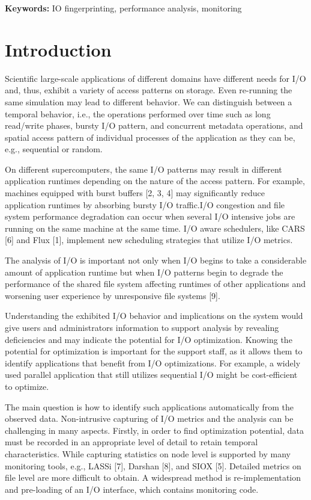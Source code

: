 \documentclass[]{llncs}
\begin{document}
\textbf{Keywords: }IO fingerprinting, performance analysis, monitoring

\section{Introduction}
Scientific large-scale applications of different domains have different needs for I/O and, thus, exhibit a variety of access patterns on storage.
Even re-running the same simulation may lead to different behavior.
We can distinguish between a temporal behavior, i.e., the operations performed over time such as long read/write phases, bursty I/O pattern, and concurrent metadata operations, and spatial access pattern of individual processes of the application as they can be, e.g., sequential or random.

On different supercomputers, the same I/O patterns may result in different application runtimes depending on the nature of the access pattern.
For example, machines equipped with burst buffers [2, 3, 4] may significantly reduce application runtimes by absorbing bursty I/O traffic.I/O congestion and file system performance degradation can occur when several I/O intensive jobs are running on the same machine at the same time.
I/O aware schedulers, like CARS [6] and Flux [1], implement new scheduling strategies that utilize I/O metrics.

The analysis of I/O is important not only when I/O begins to take a considerable amount of application runtime but when I/O patterns begin to degrade the performance of the shared file system affecting runtimes of other applications and worsening user experience by unresponsive file systems [9].

Understanding the exhibited I/O behavior and implications on the system would give users and administrators information to support analysis by revealing deficiencies and may indicate the potential for I/O optimization.
Knowing the potential for optimization is important for the support staff, as it allows them to identify applications that benefit from I/O optimizations.
For example, a widely used parallel application that still utilizes sequential I/O might be cost-efficient to optimize.

The main question is how to identify such applications automatically from the observed data.
Non-intrusive capturing of I/O metrics and the analysis can be challenging in many aspects.
Firstly, in order to find optimization potential, data must be recorded in an appropriate level of detail to retain temporal characteristics.
While capturing statistics on node level is supported by many monitoring tools, e.g., LASSi [7], Darshan [8], and SIOX [5].
Detailed metrics on file level are more difficult to obtain.
A widespread method is re-implementation and pre-loading of an I/O interface, which contains monitoring code.
\end{document}
